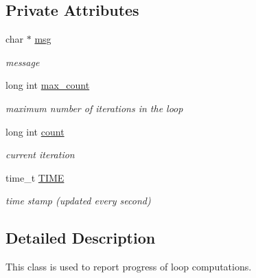 \subsection*{Private Attributes}
\begin{CompactItemize}
\item 
\hypertarget{classProgress_7eeeaec06e0ab3c1fc871ccb225ede3d}{
char $\ast$ \hyperlink{classProgress_7eeeaec06e0ab3c1fc871ccb225ede3d}{msg}}
\label{classProgress_7eeeaec06e0ab3c1fc871ccb225ede3d}

\begin{CompactList}\small\item\em message \item\end{CompactList}\item 
\hypertarget{classProgress_9cfb7b6b93778e9c617c38ab26d3d0a0}{
long int \hyperlink{classProgress_9cfb7b6b93778e9c617c38ab26d3d0a0}{max\_\-count}}
\label{classProgress_9cfb7b6b93778e9c617c38ab26d3d0a0}

\begin{CompactList}\small\item\em maximum number of iterations in the loop \item\end{CompactList}\item 
\hypertarget{classProgress_f7e775f01228c66c3ee7617a2ba1ab5c}{
long int \hyperlink{classProgress_f7e775f01228c66c3ee7617a2ba1ab5c}{count}}
\label{classProgress_f7e775f01228c66c3ee7617a2ba1ab5c}

\begin{CompactList}\small\item\em current iteration \item\end{CompactList}\item 
\hypertarget{classProgress_ac96c2b090cf1fe16e16c9a4be676888}{
time\_\-t \hyperlink{classProgress_ac96c2b090cf1fe16e16c9a4be676888}{TIME}}
\label{classProgress_ac96c2b090cf1fe16e16c9a4be676888}

\begin{CompactList}\small\item\em time stamp (updated every second) \item\end{CompactList}\end{CompactItemize}


\subsection{Detailed Description}
This class is used to report progress of loop computations. 

